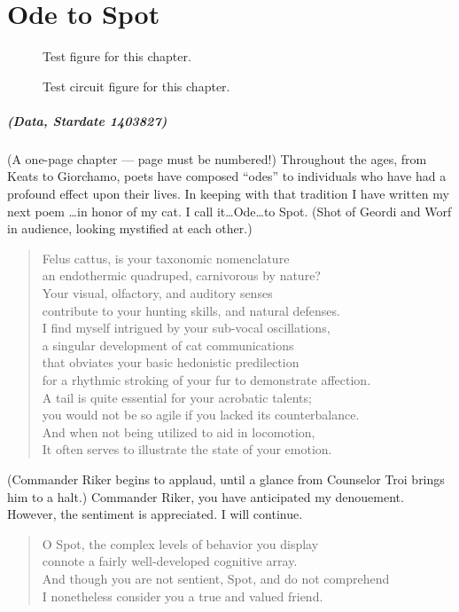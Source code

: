 
\chapter{Ode to Spot}	\OnePageChapter %
\begin{figure}[htbp]
    \centering
    
    \caption{Test figure for this chapter.}
\end{figure}
\begin{figure}[htbp]
    \centering
    
    \caption{Test circuit figure for this chapter.}
\end{figure}


\noindent\paragraph{(Data, Stardate 1403827)} (A one-page chapter --- page must
be numbered!) Throughout the ages, from Keats to Giorchamo, poets have composed
``odes'' to individuals who have had a profound effect upon their lives.  In
keeping with that tradition I have written my next poem \ldots in honor of my
cat.  I call it\ldots{}Ode\ldots{}to Spot.  (Shot of Geordi and Worf in
audience, looking mystified at each other.)

\begin{quotation}
\noindent Felus cattus, is your taxonomic nomenclature \\
an endothermic quadruped, carnivorous by nature? \\
Your visual, olfactory, and auditory senses \\
contribute to your hunting skills, and natural defenses. \\
I find myself intrigued by your sub-vocal oscillations, \\
a singular development of cat communications \\
that obviates your basic hedonistic predilection \\
for a rhythmic stroking of your fur to demonstrate affection. \\
A tail is quite essential for your acrobatic talents; \\
you would not be so agile if you lacked its counterbalance. \\
And when not being utilized to aid in locomotion, \\
It often serves to illustrate the state of your emotion.
\end{quotation}

\noindent(Commander Riker begins to applaud, until a glance from Counselor Troi
brings him to a halt.) Commander Riker, you have anticipated my denouement.
However, the sentiment is appreciated.  I will continue.

\begin{quotation}
\noindent O Spot, the complex levels of behavior you display \\
connote a fairly well-developed cognitive array. \\
And though you are not sentient, Spot, and do not comprehend \\
I nonetheless consider you a true and valued friend.
\end{quotation}
